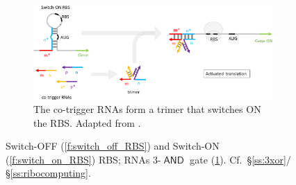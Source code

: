 \documentclass[12pt,notitlepage]{article}
\let\cite\citep
\newcommand{\AND}{\ensuremath{\mathop{\mathsf{AND}}}\xspace}
\begin{document}
\begin{figure}[!p]
    \begin{subfigure}{\linewidth}
        \centering
        \includegraphics[width=\linewidth]{xor_ribocomputing/3_trigger_rna_on}
        \caption{%
            The co-trigger RNAs form a trimer that switches ON the RBS.
            Adapted from
            \cite[\href{https://www.nature.com/articles/nature23271/figures/3}{Fig.~3a}]{GreenETAL2017}.
        }
        \label{f:3_RNA_on_RBS}
    \end{subfigure}
    
    \caption{%
        Switch-OFF (\ref{f:switch_off_RBS})
        and 
        Switch-ON (\ref{f:switch_on_RBS}) RBS;
        RNAs 3-\AND gate (\ref{f:3_RNA_on_RBS}). 
        Cf.~\S\ref{ss:3xor}/\S\ref{ss:ribocomputing}.
    }
    \label{f:switch_RBS}
\end{figure}

%
\end{document}
